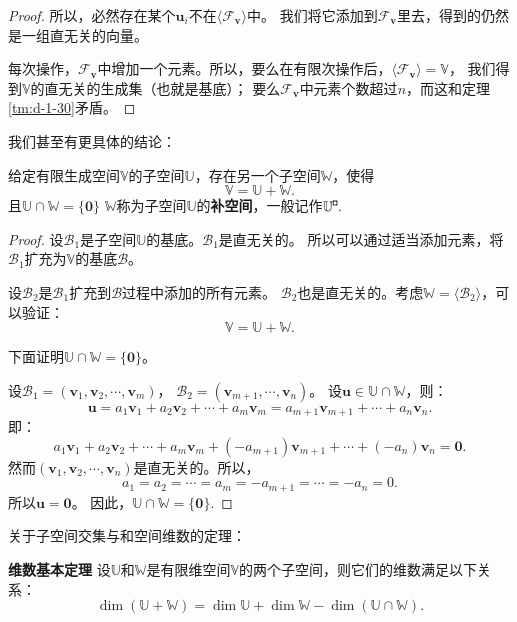 \documentclass[12pt,UTF8,fontset=none]{ctexbook}
\begin{document}
\begin{appendix}
\begin{proof}
    所以，必然存在某个$\mathbf{u}_i$不在$\langle\mathcal{F}_{\mathbf{v}}\rangle$中。
    我们将它添加到$\mathcal{F}_{\mathbf{v}}$里去，得到的仍然是一组直无关的向量。

    每次操作，$\mathcal{F}_{\mathbf{v}}$中增加一个元素。所以，要么在有限次操作后，$\langle\mathcal{F}_{\mathbf{v}}\rangle = \mathbb{V}$，
    我们得到$\mathbb{V}$的直无关的生成集（也就是基底）；
    要么$\mathcal{F}_{\mathbf{v}}$中元素个数超过$n$，而这和定理\ref{tm:d-1-30}矛盾。
\end{proof}

我们甚至有更具体的结论：
\begin{tm}\label{tm:d-1-70}
    给定有限生成空间$\mathbb{V}$的子空间$\mathbb{U}$，存在另一个子空间$\mathbb{W}$，使得
    $$ \mathbb{V} = \mathbb{U} + \mathbb{W}.$$
    且$\mathbb{U} \cap \mathbb{W} = \{\mathbf{0}\}$
    $\mathbb{W}$称为子空间$\mathbb{U}$的\textbf{补空间}，一般记作$\mathbb{U}^{\bu}.$
\end{tm}

\begin{proof}
    设$\mathcal{B}_1$是子空间$\mathbb{U}$的基底。$\mathcal{B}_1$是直无关的。
    所以可以通过适当添加元素，将$\mathcal{B}_1$扩充为$\mathbb{V}$的基底$\mathcal{B}$。

    设$\mathcal{B}_2$是$\mathcal{B}_1$扩充到$\mathcal{B}$过程中添加的所有元素。
    $\mathcal{B}_2$也是直无关的。考虑$\mathbb{W} = \langle\mathcal{B}_2\rangle$，可以验证：
    $$ \mathbb{V} = \mathbb{U} + \mathbb{W}.$$

    下面证明$ \mathbb{U} \cap \mathbb{W} = \{\mathbf{0}\}$。

    设$\mathcal{B}_1 = (\mathbf{v}_1, \mathbf{v}_2, \cdots , \mathbf{v}_m )$，
    $\mathcal{B}_2 = (\mathbf{v}_{m+1}, \cdots , \mathbf{v}_n )$。 
    设$ \mathbf{u} \in \mathbb{U} \cap \mathbb{W}$，则：
    $$ \mathbf{u} = a_1\mathbf{v}_1 + a_2\mathbf{v}_2 + \cdots + a_m\mathbf{v}_m = a_{m+1}\mathbf{v}_{m+1} + \cdots + a_n\mathbf{v}_n. $$
    即：
    $$a_1\mathbf{v}_1 + a_2\mathbf{v}_2 + \cdots + a_m\mathbf{v}_m + (-a_{m+1})\mathbf{v}_{m+1} + \cdots + (-a_{n})\mathbf{v}_{n} = \mathbf{0}. $$
    然而$(\mathbf{v}_1, \mathbf{v}_2, \cdots , \mathbf{v}_n )$是直无关的。所以，
    $$ a_1 = a_2 = \cdots = a_m = -a_{m+1} = \cdots = -a_n = 0.$$
    所以$\mathbf{u} = \mathbf{0}$。
    因此，$ \mathbb{U} \cap \mathbb{W} = \{\mathbf{0}\}$.
\end{proof}

关于子空间交集与和空间维数的定理：
\begin{tm}{\textbf{维数基本定理}}\label{tm:d-1-80}
    设$\mathbb{U}$和$\mathbb{W}$是有限维空间$\mathbb{V}$的两个子空间，则它们的维数满足以下关系：
    $$ \dim (\mathbb{U} + \mathbb{W}) = \dim \mathbb{U} + \dim \mathbb{W} - \dim (\mathbb{U} \cap \mathbb{W}).$$
\end{tm}


\end{appendix}
\end{document}
